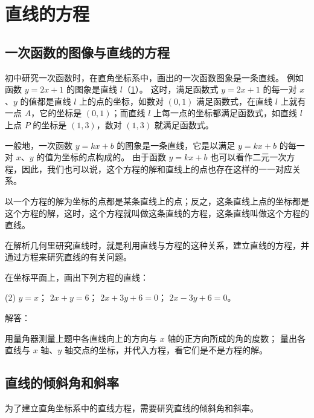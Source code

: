 \section{直线的方程}
\subsection{一次函数的图像与直线的方程}
初中研究一次函数时，在直角坐标系中，画出的一次函数图象是一条直线。
例如函数 $y=2x+1$ 的图象是直线 $l$（\cref{fig:1-14}）。
这时，满足函数式 $y=2x+1$ 的每一对 $x$、$y$ 的值都是直线 $l$ 上的点的坐标，如数对 $(0,1)$ 满足函数式，在直线 $l$ 上就有一点 $A$，它的坐标是 $(0,1)$；而直线  $l$ 上每一点的坐标都满足函数式，如直线 $l$ 上点 $P$ 的坐标是 $(1,3)$，数对 $(1,3)$ 就满足函数式。
\begin{figure}
  \caption{}\label{fig:1-14}
\end{figure}

一般地，一次函数 $y=kx+b$ 的图象是一条直线，它是以满足 $y=kx+b$ 的每一对 $x$、$y$ 的值为坐标的点构成的。
由于函数 $y=kx+b$ 也可以看作二元一次方程，因此，我们也可以说，这个方程的解和直线上的点也存在这样的一一对应关系。

以一个方程的解为坐标的点都是某条直线上的点；反之，这条直线上点的坐标都是这个方程的解，这时，这个方程就叫做这条直线的方程，这条直线叫做这个方程的直线。

在解析几何里研究直线时，就是利用直线与方程的这种关系，建立直线的方程，并通过方程来研究直线的有关问题。

\begin{Practice}
  \begin{question}
    \item 在坐标平面上，画出下列方程的直线：
    \begin{tasks}(2)
      \task $y=x$；
      \task $2x+y=6$；
      \task $2x+3y+6=0$；
      \task $2x-3y+6=0$。
    \end{tasks}
    \item 解答：
    \begin{tasks}
      \task 用量角器测量上题中各直线向上的方向与 $x$ 轴的正方向所成的角的度数；
      \task 量出各直线与 $x$ 轴、$y$ 轴交点的坐标，并代入方程，看它们是不是方程的解。
    \end{tasks}
  \end{question}
\end{Practice}

\subsection{直线的倾斜角和斜率}
为了建立直角坐标系中的直线方程，需要研究直线的倾斜角和斜率。

